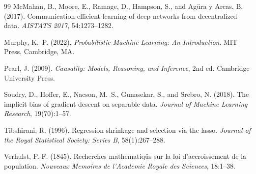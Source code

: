﻿\documentclass[12pt, a4paper]{article}
\theoremstyle{definition}
\theoremstyle{remark}
\begin{document}
\begin{thebibliography}{99}
McMahan, B., Moore, E., Ramage, D., Hampson, S., and Agüra y Arcas, B. (2017).
\newblock Communication-efficient learning of deep networks from decentralized data.
\newblock \textit{AISTATS 2017}, 54:1273--1282.

Murphy, K.~P. (2022).
\newblock \textit{Probabilistic Machine Learning: An Introduction}.
\newblock MIT Press, Cambridge, MA.

Pearl, J. (2009).
\newblock \textit{Causality: Models, Reasoning, and Inference}, 2nd ed.
\newblock Cambridge University Press.

Soudry, D., Hoffer, E., Nacson, M.~S., Gunasekar, S., and Srebro, N. (2018).
\newblock The implicit bias of gradient descent on separable data.
\newblock \textit{Journal of Machine Learning Research}, 19(70):1--57.

Tibshirani, R. (1996).
\newblock Regression shrinkage and selection via the lasso.
\newblock \textit{Journal of the Royal Statistical Society: Series B}, 58(1):267--288.

Verhulst, P.-F. (1845).
\newblock Recherches mathematiqüs sur la loi d'accroissement de la population.
\newblock \textit{Nouveaux Memoires de l'Academie Royale des Sciences}, 18:1--38.

\end{thebibliography}
\end{document}
